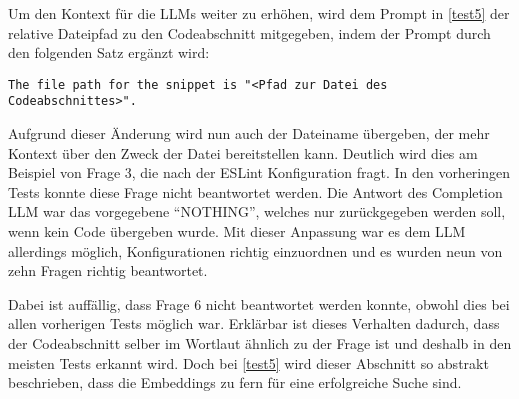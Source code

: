 \documentclass[../main.tex]{subfiles}
\begin{document}
Um den Kontext für die \glspl{LLM} weiter zu erhöhen, wird dem Prompt in \ref{test5} der relative Dateipfad zu den Codeabschnitt mitgegeben, indem der Prompt durch den folgenden Satz ergänzt wird:
\begin{center}
\begin{lstlisting}
The file path for the snippet is "<Pfad zur Datei des Codeabschnittes>".
\end{lstlisting}
\end{center}
Aufgrund dieser Änderung wird nun auch der Dateiname übergeben, der mehr Kontext über den Zweck der Datei bereitstellen kann.
Deutlich wird dies am Beispiel von Frage 3, die nach der ESLint Konfiguration fragt.
In den vorheringen Tests konnte diese Frage nicht beantwortet werden.
Die Antwort des Completion \gls{LLM} war das vorgegebene \enquote{NOTHING}, welches nur zurückgegeben werden soll, wenn kein Code übergeben wurde.
Mit dieser Anpassung war es dem \gls{LLM} allerdings möglich, Konfigurationen richtig einzuordnen und es wurden neun von zehn Fragen richtig beantwortet.

Dabei ist auffällig, dass Frage 6 nicht beantwortet werden konnte, obwohl dies bei allen vorherigen Tests möglich war. 
Erklärbar ist dieses Verhalten dadurch, dass der Codeabschnitt selber im Wortlaut ähnlich zu der Frage ist und deshalb in den meisten Tests erkannt wird.
Doch bei \ref{test5} wird dieser Abschnitt so abstrakt beschrieben, dass die Embeddings zu fern für eine erfolgreiche Suche sind.
\end{document}
